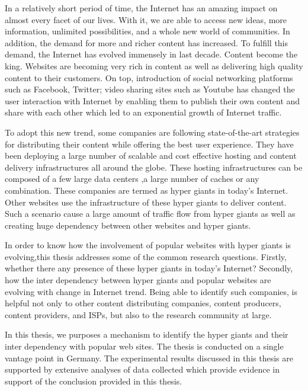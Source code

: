 In a relatively short period of time, the Internet has an amazing impact on almost every facet of our lives. With it, we are able to access new ideas, more information, unlimited possibilities, and a whole new world of communities. In addition, the demand for more and richer content has increased. To fulfill this demand, the Internet has evolved immensely in last decade. Content become the king. Websites are becoming very rich in content as well as delivering high quality content to their customers. On top, introduction of social networking platforms such as Facebook, Twitter; video sharing sites such as Youtube has changed the user interaction with Internet by enabling them to publish their own content and share with each other which led to an exponential growth of Internet traffic. 

To adopt this new trend, some companies are following state-of-the-art strategies for distributing their content while offering the best user experience. They have been deploying a large number of scalable and cost effective hosting and content delivery infrastructures all around the globe. These hosting infrastructures can be composed of a few large data centers ,a large number of caches or any combination. These companies are termed as hyper giants in today's Internet. Other websites use the infrastructure of these hyper giants to deliver content. Such a scenario cause a large amount of traffic flow from hyper giants as well as creating huge dependency between other websites and hyper giants.

In order to know how the involvement of popular websites with hyper giants is evolving,this thesis addresses some of the common research questions. Firstly, whether there any presence of these hyper giants in today's Internet? Secondly, how the inter dependency between hyper giants and popular websites are evolving with change in Internet trend. Being able to identify such companies, is helpful not only to other content distributing companies, content producers, content providers, and ISPs, but also to the research community at large. 

In this thesis, we purposes a mechanism to identify the hyper giants and their inter dependency with popular web sites. The thesis is conducted on a single vantage point in Germany. The experimental results discussed in this thesis are supported by extensive analyses of data collected which provide evidence in support of the conclusion provided in this thesis.
